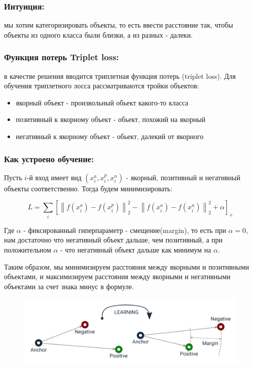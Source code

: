 \subsubsection*{Интуиция:}
мы хотим категоризировать объекты, то есть ввести расстояние так, чтобы объекты из одного класса были близки, а из разных - далеки.

\subsubsection*{Функция потерь Triplet loss:}
в качестве решения вводится триплетная функция потерь (triplet loss).
Для обучения триплетного лосса рассматриваются тройки объектов:

\begin{itemize}
    \item якорный объект - произвольный обьект какого-то класса 
    \item позитивный к якорному объект - обьект, похожий на якорный
    \item негативный к якорному объект - обьект, далекий от якорного
\end{itemize}

\subsubsection*{Как устроено обучение:}

Пусть $i$-й вход имеет вид $(x_i^a, x_i^p, x_i^n)$ - якорный, позитивный и негативный объекты соответственно. Тогда будем минимизировать:

$$L = \sum\limits_i \left[\left \lVert f(x_i^a) - f(x_i^p) \right \rVert_2^2 - \left \lVert f(x_i^a) - f(x_i^n) \right \rVert_2^2 + \alpha \right]_+$$

Где $\alpha$ - фиксированный гиперпараметр - смещение(margin), то есть при $\alpha = 0$, нам достаточно что негативный объект дальше, чем позитивный, 
а при положительном $\alpha$ - что негативный объект дальше как минимум на $\alpha$.

Таким образом, мы минимизируем расстояния между якорными и позитивными объектами,
и максимизируем расстояния между якорными и негативными объектами за счет знака минус в формуле.

\begin{figure}[h]
    \centering
    \includegraphics[scale=0.5]{chapters/nonstandart_error/images/triplet_loss_learning.png}
\end{figure}

